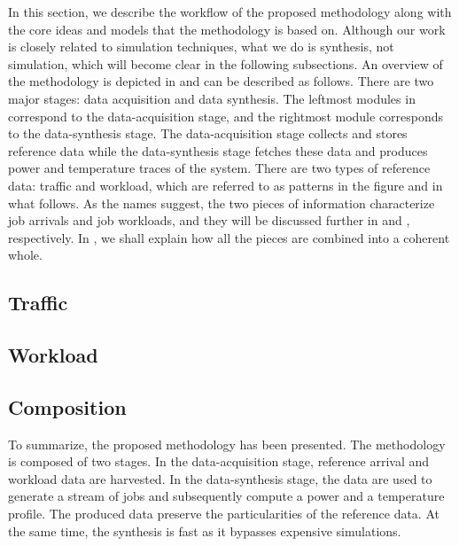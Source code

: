 In this section, we describe the workflow of the proposed methodology along with
the core ideas and models that the methodology is based on. Although our work is
closely related to simulation techniques, what we do is synthesis, not
simulation, which will become clear in the following subsections. An overview of
the methodology is depicted in  and can be described as
follows. There are two major stages: data acquisition and data synthesis. The
leftmost modules in  correspond to the data-acquisition stage,
and the rightmost module corresponds to the data-synthesis stage. The
data-acquisition stage collects and stores reference data while the
data-synthesis stage fetches these data and produces power and temperature
traces of the system. There are two types of reference data: traffic and
workload, which are referred to as patterns in the figure and in what follows.
As the names suggest, the two pieces of information characterize job arrivals
and job workloads, and they will be discussed further in  and
, respectively. In , we shall explain how all
the pieces are combined into a coherent whole.

\subsection{Traffic} 


\subsection{Workload} 


\subsection{Composition} 


To summarize, the proposed methodology has been presented. The methodology is
composed of two stages. In the data-acquisition stage, reference arrival and
workload data are harvested. In the data-synthesis stage, the data are used to
generate a stream of jobs and subsequently compute a power and a temperature
profile. The produced data preserve the particularities of the reference data.
At the same time, the synthesis is fast as it bypasses expensive simulations.
